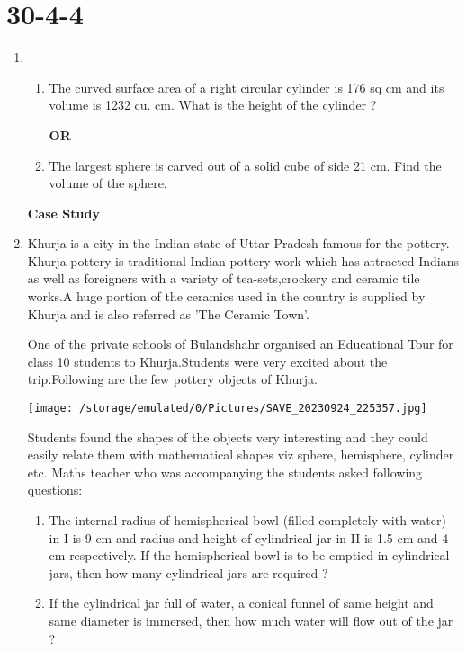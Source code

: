 \documentclass[15pt]{article}
\begin{document}
             \section{30-4-4}
    \begin{enumerate}
        \item \begin{enumerate}
       
            \item The curved surface area of a right circular cylinder is 176 sq cm and its volume is 1232 cu. cm. What is the  height of the cylinder ?
             \begin{center}
             \textbf{OR}
             \end{center}
             \item The largest sphere is carved out of a solid cube of side 21 cm. Find the volume of the sphere.
            \end{enumerate}
        \begin{center}
            \textbf{Case Study}
        \end{center}
        \item Khurja is a city in the Indian state of Uttar Pradesh famous for the pottery. Khurja pottery is traditional Indian pottery work which has attracted Indians as well as foreigners with a variety of tea-sets,crockery and ceramic tile works.A huge portion of the ceramics used in the country is supplied by Khurja and is also referred as 'The Ceramic Town'.

        One of the private schools of Bulandshahr organised an Educational Tour for class 10 students to Khurja.Students were very excited about the trip.Following  are the few pottery objects of Khurja.
        \begin{center}
            \texttt{[image:              /storage/emulated/0/Pictures/SAVE\_20230924\_225357.jpg]}
        \end{center}
        Students found the shapes of the objects very interesting and they could easily relate them with mathematical shapes viz sphere, hemisphere, cylinder etc. Maths teacher who was accompanying the students asked following questions:
       \begin{enumerate}
           \item The internal radius of hemispherical bowl (filled completely with water) in I is 9 cm and radius and height of cylindrical jar in II is 1.5 cm and 4 cm respectively. If the hemispherical bowl is to be emptied in cylindrical jars, then how many cylindrical jars are required ?
           \item If the cylindrical jar full of water, a conical funnel of same height and same diameter is immersed, then how much water will flow out of the jar ?
       \end{enumerate}
 \end{enumerate}
\end{document}
